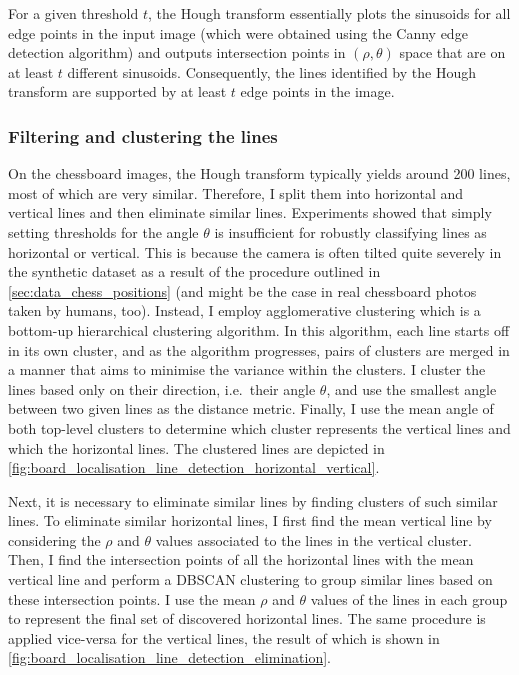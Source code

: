 \documentclass[../report.tex]{subfiles}
\begin{document}
For a given threshold $t$, the Hough transform essentially plots the sinusoids for all edge points in the input image (which were obtained using the Canny edge detection algorithm) and outputs intersection points in $(\rho,\theta)$ space that are on at least $t$ different sinusoids.
Consequently, the lines identified by the Hough transform are supported by at least $t$ edge points in the image.

\subsubsection{Filtering and clustering the lines}
On the chessboard images, the Hough transform typically yields around 200 lines, most of which are very similar. 
Therefore, I split them into horizontal and vertical lines and then eliminate similar lines.
Experiments showed that simply setting thresholds for the angle $\theta$ is insufficient for robustly classifying lines as horizontal or vertical.
This is because the camera is often tilted quite severely in the synthetic dataset as a result of the procedure outlined in \cref{sec:data_chess_positions} (and might be the case in real chessboard photos taken by humans, too).
Instead, I employ agglomerative clustering which is a bottom-up hierarchical clustering algorithm.
In this algorithm, each line starts off in its own cluster, and as the algorithm progresses, pairs of clusters are merged in a manner that aims to minimise the variance within the clusters.
I cluster the lines based only on their direction, i.e.\ their angle $\theta$, and use the smallest angle between two given lines as the distance metric.
Finally, I use the mean angle of both top-level clusters to determine which cluster represents the vertical lines and which the horizontal lines.
The clustered lines are depicted in \cref{fig:board_localisation_line_detection_horizontal_vertical}.

Next, it is necessary to eliminate similar lines by finding clusters of such similar lines.
To eliminate similar horizontal lines, I first find the mean vertical line by considering the $\rho$ and $\theta$ values associated to the lines in the vertical cluster.
Then, I find the intersection points of all the horizontal lines with the mean vertical line and perform a DBSCAN clustering \cite{ester1996} to group similar lines based on these intersection points.
I use the mean $\rho$ and $\theta$ values of the lines in each group to represent the final set of discovered horizontal lines. 
The same procedure is applied vice-versa for the vertical lines, the result of which is shown in \cref{fig:board_localisation_line_detection_elimination}.
\end{document}
